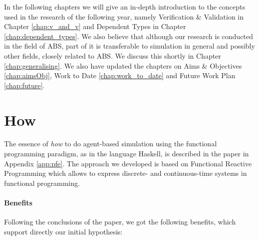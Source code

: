 In the following chapters we will give an in-depth introduction to the concepts used in the research of the following year, namely Verification \& Validation in Chapter \ref{chap:v_and_v} and Dependent Types in Chapter \ref{chap:dependent_types}. We also believe that although our research is conducted in the field of ABS, part of it is transferable to simulation in general and possibly other fields, closely related to ABS. We discuss this shortly in Chapter \ref{chap:generalising}. We also have updated the chapters on Aims \& Objectives \ref{chap:aimsObj}, Work to Date \ref{chap:work_to_date} and Future Work Plan \ref{chap:future}.

\section{How}
\label{sect:how}
The essence of \textit{how} to do agent-based simulation using the functional programming paradigm, as in the language Haskell, is described in the paper in Appendix \ref{app:pfe}. The approach we developed is based on Functional Reactive Programming which allows to express discrete- and continuous-time systems in functional programming. 

\paragraph{Benefits} Following the conclusions of the paper, we got the following benefits, which support directly our initial hypothesis:

